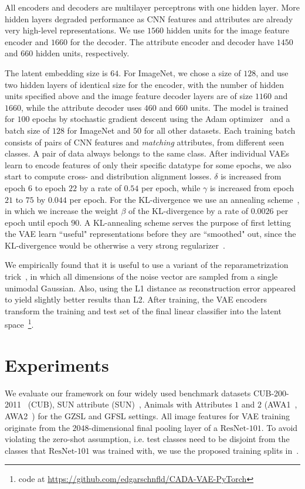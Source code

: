 \documentclass[10pt,twocolumn,letterpaper]{article}
\newcommand{\myparagraph}[1]{\vspace{6pt}\noindent{\bf #1}}
\begin{document}
\myparagraph{Implementation Details.}
\label{sec:impl}
All encoders and decoders are multilayer perceptrons with one hidden layer. More hidden layers degraded performance as CNN features and attributes are already very high-level representations.
We use $1560$ hidden units for the image feature encoder and $1660$ for the decoder. The attribute encoder and decoder have $1450$ and $660$ hidden units, respectively.

The latent embedding size is $64$. For ImageNet, we chose a size of $128$, and use two hidden layers of identical size for the encoder, with the number of hidden units specified above and the image feature decoder layers are of size $1160$ and $1660$, while the attribute decoder uses $460$ and $660$ units. The model is trained for $100$ epochs by stochastic gradient descent using the Adam optimizer~\cite{adam} and a batch size of $128$ for ImageNet and $50$ for all other datasets. Each training batch consists of pairs of CNN features and \textit{matching} attributes, from different seen classes. A pair of data always belongs to the same class.
After individual VAEs learn to encode features of only their specific datatype for some epochs, we also start to compute cross- and distribution alignment losses.  
$\delta$  is increased from epoch $6$ to epoch $22$ by a rate of $0.54$ per epoch, while  $\gamma$ is increased from epoch $21$ to $75$ by $0.044$ per epoch.
For the KL-divergence we use an annealing scheme~\cite{bowman2016generating}, in which we increase the weight $\beta$ of the KL-divergence by a rate of $0.0026$ per epoch until epoch $90$. A KL-annealing scheme serves the purpose of first letting the VAE learn ``useful" representations before they are ``smoothed" out, since the KL-divergence would be otherwise a very strong regularizer~\cite{bowman2016generating}.

We empirically found that it is useful to use a variant of the reparametrization trick~\cite{kingmawelling}, in which all dimensions of the noise vector are sampled from a single unimodal Gaussian. Also, using the L1 distance as reconstruction error appeared to yield slightly better results than L2.
After training, the VAE encoders transform the training and test set of the final linear classifier into the latent space~\footnote{code at \href{https://github.com/edgarschnfld/CADA-VAE-PyTorch}{https://github.com/edgarschnfld/CADA-VAE-PyTorch}}.



\section{Experiments}
\label{sec:exp}
We evaluate our framework on four widely used benchmark datasets CUB-200-2011~\cite{cub} (CUB), SUN attribute (SUN)~\cite{sun}, Animals with Attributes $1$ and $2$ (AWA1~\cite{DAP}, AWA2~\cite{goodbadugly}) for the GZSL and GFSL settings.
All image features for VAE training originate from the $2048$-dimensional final pooling layer of a $\mathrm{ResNet}$-$\mathrm{101}$. To avoid violating the zero-shot assumption, i.e. test classes need to be disjoint from the classes that $\mathrm{ResNet}$-$\mathrm{101}$ was trained with, we use the proposed training splits in~\cite{goodbadugly}.
\end{document}
